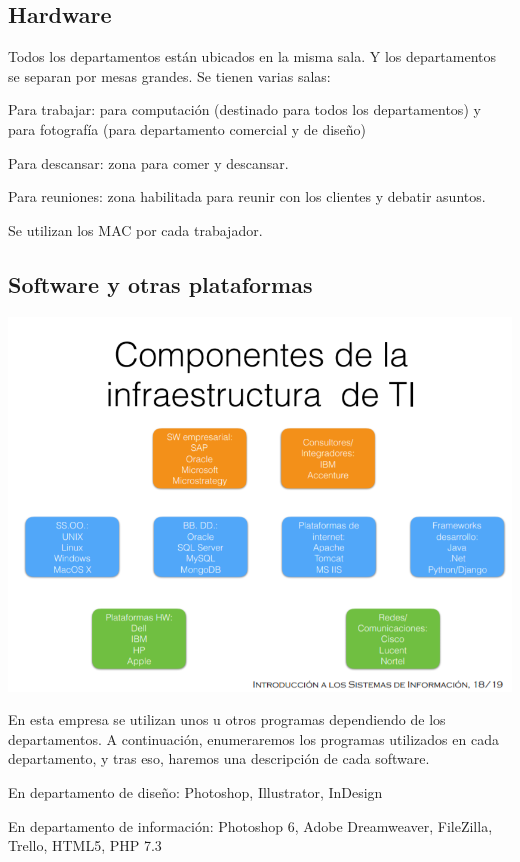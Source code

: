 \documentclass{article}
\begin{document}
\subsection{Hardware}

Todos los departamentos están ubicados en la misma sala. Y los departamentos se separan por mesas grandes. Se tienen varias salas: 

Para trabajar: para computación (destinado para todos los departamentos) y para fotografía (para departamento comercial y de diseño)  

Para descansar: zona para comer y descansar.  

Para reuniones: zona habilitada para reunir con los clientes y debatir asuntos.  

Se utilizan los MAC por cada trabajador.

\subsection{Software y otras plataformas}

\begin{center}
\includegraphics[scale=0.5]{images/componentes.png}
\end{center}

En esta empresa se utilizan unos u otros programas dependiendo de los departamentos. A continuación, enumeraremos los programas utilizados en cada departamento, y tras eso, haremos una descripción de cada software.  

En departamento de diseño: Photoshop, Illustrator, InDesign 

En departamento de información:  Photoshop 6, Adobe Dreamweaver, FileZilla, Trello, HTML5, PHP 7.3 
\end{document}
